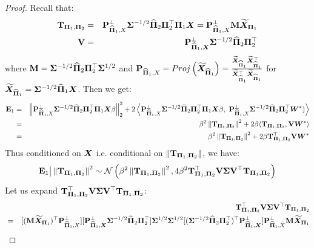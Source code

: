 \documentclass[numsec,webpdf,modern,medium,namedate]{oup-authoring-template}
\theoremstyle{thmstyleone}%
\theoremstyle{thmstyletwo}%
\theoremstyle{thmstylethree}%
\begin{document}
\begin{proof}
           Recall that:
    \begin{eqnarray*}
        \mathbf{T}_{\boldsymbol{\Pi}_1, \boldsymbol{\Pi}_2} & = & \mathbf{P}_{\widehat{\boldsymbol{\Pi}}_1, X}^\perp {\boldsymbol{\Sigma}}^{-1/2} \widehat{\boldsymbol{\Pi}}_2 \boldsymbol{\Pi}_2^\top \boldsymbol{\Pi}_1 \boldsymbol{X} = \mathbf{P}_{\widehat{\boldsymbol{\Pi}}_1, X}^\perp \mathbf{M} \widetilde{\boldsymbol{X}}_{\boldsymbol{\Pi}_1}\\
        \mathbf{V} & = & \mathbf{P}_{\widehat{\boldsymbol{\Pi}}_1,\boldsymbol{X}}^\perp {\boldsymbol{\Sigma}}^{-1/2} \widehat{\boldsymbol{\Pi}}_2 \boldsymbol{\Pi}_2^\top
    \end{eqnarray*}
    where $\mathbf{M} = {\boldsymbol{\Sigma}}^{-1/2} \widehat{\boldsymbol{\Pi}}_2 \boldsymbol{\Pi}_2^\top {\boldsymbol{\Sigma}}^{1/2}$ and $\mathbf{P}_{\widehat{\boldsymbol{\Pi}}_1, X} = Proj\left(\widetilde{\boldsymbol{X}}_{\widehat{\boldsymbol{\Pi}}_1}\right) = \frac{\widetilde{\boldsymbol{X}}_{\widehat{\boldsymbol{\Pi}}_1}\widetilde{\boldsymbol{X}}_{\widehat{\boldsymbol{\Pi}}_1}^\top}{\widetilde{\boldsymbol{X}}_{\widehat{\boldsymbol{\Pi}}_1}^\top \widetilde{\boldsymbol{X}}_{\widehat{\boldsymbol{\Pi}}_1}}$ for $\widetilde{\boldsymbol{X}}_{\widehat{\boldsymbol{\Pi}}_1} = {\boldsymbol{\Sigma}}^{-1/2}\widehat{\boldsymbol{\Pi}}_1\boldsymbol{X}$. Then we get:
    {\small
    \begin{eqnarray*}
     \bE_1 & = & \left\| \bP_{\hatPi_1, X}^\perp {\bSig}^{-1/2} \hatPi_2 \bPi_2^\top \bPi_1 \bX \beta \right\|_2^2 
        + 2 \left\langle 
        \bP_{\hatPi_1, X}^\perp {\bSig}^{-1/2} \hatPi_2 \bPi_2^\top \bPi_1 \bX \beta,\ 
        \bP_{\hatPi_1, X}^\perp {\bSig}^{-1/2} \hatPi_2 \bPi_2^\top \bW^\ast)\right\rangle\\
        & = & \beta^2 \left\|\bT_{\bPi_1, \bPi_2} \right\|^2 + 2 \beta\langle\bT_{\bPi_1, \bPi_2},\bV\bW^\ast\rangle\\
        & = & \beta^2 \left\|\bT_{\bPi_1, \bPi_2} \right\|^2 + 2 \beta\bT_{\bPi_1, \bPi_2}^\top\bV\bW^\ast
    \end{eqnarray*}}
    Thus conditioned on $\boldsymbol{X}$ i.e. conditional on $\left\|\mathbf{T}_{\boldsymbol{\Pi}_1, \boldsymbol{\Pi}_2} \right\|$, we have:
    \begin{eqnarray*}
        \mathbf{E}_1\big|\left\|\mathbf{T}_{\boldsymbol{\Pi}_1, \boldsymbol{\Pi}_2} \right\|^2  \sim \mathcal{N} \left( \beta^2 \left\|\mathbf{T}_{\boldsymbol{\Pi}_1, \boldsymbol{\Pi}_2} \right\|^2, 4\beta^2 \mathbf{T}_{\boldsymbol{\Pi}_1, \boldsymbol{\Pi}_2}^\top \mathbf{V} {\boldsymbol{\Sigma}} \mathbf{V}^\top \mathbf{T}_{\boldsymbol{\Pi}_1, \boldsymbol{\Pi}_2} \right)
    \end{eqnarray*}
    Let us expand $\mathbf{T}_{\boldsymbol{\Pi}_1, \boldsymbol{\Pi}_2}^\top \mathbf{V} {\boldsymbol{\Sigma}} \mathbf{V}^\top \mathbf{T}_{\boldsymbol{\Pi}_1, \boldsymbol{\Pi}_2}$:
    {\small
    \begin{eqnarray*}
        && \bT_{\bPi_1, \bPi_2}^\top \bV {\bSig} \bV^\top \bT_{\bPi_1, \bPi_2} \\
        & = & [(\bM \widetilde{\bX}_{\bPi_1})^\top\bP_{\hatPi_1, X}^\perp][ \bP_{\hatPi_1,\bX}^\perp {\bSig}^{-1/2} \hatPi_2 \bPi_2^\top] {\bSig}^{1/2} \bSig^{1/2}[({\bSig}^{-1/2} \hatPi_2 \bPi_2^\top)^\top\bP_{\hatPi_1,\bX}^\perp ]\bP_{\hatPi_1, X}^\perp \bM \widetilde{\bX}_{\bPi_1}\\

\end{eqnarray*}}
\end{proof}
\end{document}
